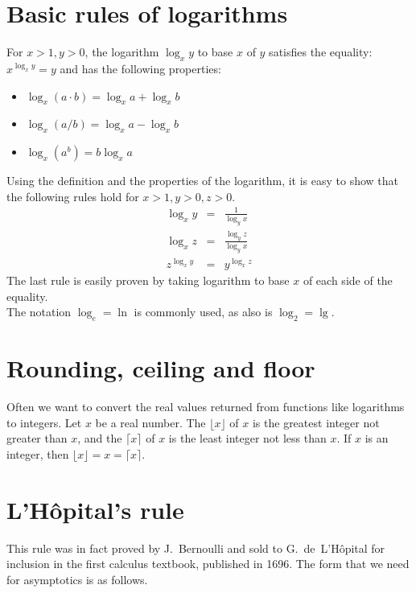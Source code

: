 \section{Basic rules of logarithms}

For $x>1, y > 0$, the logarithm \(\log_x y\) to base \(x\) of \(y\) satisfies the equality:
\(
x^{\log_x y} = y
\)
and has the following properties:
\begin{itemize}
\item \(\log_x ( a \cdot b ) = \log_x a + \log_x b\)
\item \(\log_x ( a / b )     = \log_x a - \log_x b\)
\item \(\log_x ( a^b )       = b \log_x a\)
\end{itemize}

Using the definition and the properties of the logarithm,
it is easy to show that the following rules hold for $x>1, y>0, z>0$.
\[
\begin{array}{lll} 
\log_x y & = & \frac{1}{\log_y x}\\
\log_x z & = & \frac{\log_y z}{\log_y x}\\
z^{\log_x y} & = & y^{\log_x z}
\end{array}
\]
The last rule is easily proven by taking logarithm to base
\(x\) of each side of the equality.\\

The notation $\log_{e} = \ln$ is commonly used, as also is $\log_2 = \lg$.

\section{Rounding, ceiling and floor}

Often we want to convert the real values returned from functions like 
logarithms to integers. Let $x$ be a real number.
The  $\lfloor x \rfloor$ of $x$ is the greatest integer 
not greater than $x$, and the 
$\lceil x \rceil$ of $x$ is the least integer not less than $x$. If $x$ is an integer, then $\lfloor x \rfloor = x = \lceil x \rceil$.

\section{L'H\^{o}pital's rule}
\label{sec:app:lhopital}

This rule was in fact proved by J.~Bernoulli and sold to G.~de~L'H\^{o}pital for 
inclusion in the first calculus textbook, published in 1696. The form that we 
need for asymptotics is as follows.

